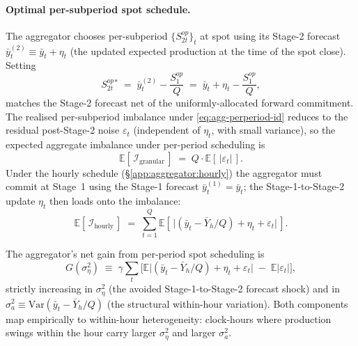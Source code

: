 \documentclass[11pt]{article}
\begin{document}
\paragraph{Optimal per-subperiod spot schedule.} The aggregator chooses per-subperiod $\{S^{op}_{2t}\}_t$ at spot using its Stage-2 forecast $\bar y_t^{(2)} \equiv \bar y_t + \eta_t$ (the updated expected production at the time of the spot close). Setting
\begin{equation}
S^{op}_{2t}{}^{*} \;=\; \bar y_t^{(2)} - \frac{S^{op}_1}{Q} \;=\; \bar y_t + \eta_t - \frac{S^{op}_1}{Q},
\label{eq:agg-perperiod-id}
\end{equation}
matches the Stage-2 forecast net of the uniformly-allocated forward commitment. The realised per-subperiod imbalance under \eqref{eq:agg-perperiod-id} reduces to the residual post-Stage-2 noise $\varepsilon_t$ (independent of $\eta_t$, with small variance), so the expected aggregate imbalance under per-period scheduling is
\[
\mathbb{E}\!\left[\,\mathcal{I}_{\text{granular}}\,\right] \;=\; Q\cdot\mathbb{E}\!\left[\,|\varepsilon_t|\,\right].
\]
Under the hourly schedule (\S\ref{app:aggregator:hourly}) the aggregator must commit at Stage~1 using the Stage-1 forecast $\bar y_t^{(1)} = \bar y_t$; the Stage-1-to-Stage-2 update $\eta_t$ then loads onto the imbalance:
\[
\mathbb{E}\!\left[\,\mathcal{I}_{\text{hourly}}\,\right] \;=\; \sum_{t=1}^{Q} \mathbb{E}\!\left[\,\big|(\bar y_t - \bar Y_h/Q) + \eta_t + \varepsilon_t\big|\,\right].
\]

The aggregator's net gain from per-period spot scheduling is
\begin{equation}
G(\sigma_\eta^2) \;\equiv\; \gamma\!\sum_t\!\Big[\mathbb{E}\big|(\bar y_t - \bar Y_h/Q) + \eta_t + \varepsilon_t\big| \;-\; \mathbb{E}\big|\varepsilon_t\big|\Big],
\label{eq:agg-gain}
\end{equation}
strictly increasing in $\sigma_\eta^2$ (the avoided Stage-1-to-Stage-2 forecast shock) and in $\sigma_a^2 \equiv \mathrm{Var}(\bar y_t - \bar Y_h/Q)$ (the structural within-hour variation). Both components map empirically to within-hour heterogeneity: clock-hours where production swings within the hour carry larger $\sigma_\eta^2$ and larger $\sigma_a^2$.
\end{document}
